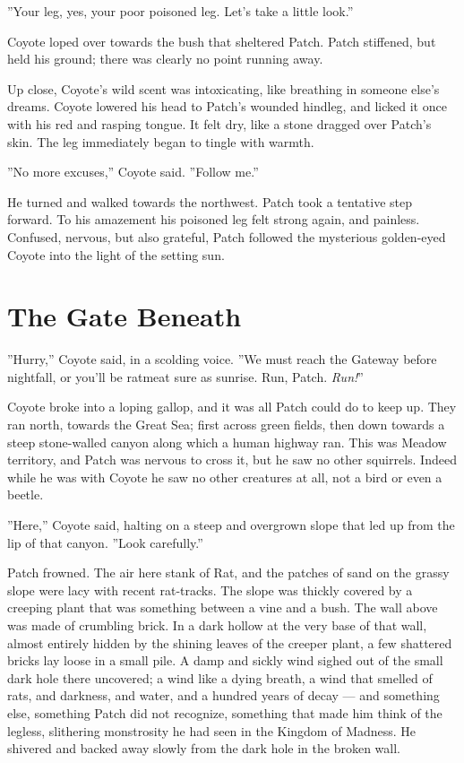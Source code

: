 \documentclass[12pt]{book}
\begin{document}
''Your leg, yes, your poor poisoned leg. Let's take a little look.''

Coyote loped over towards the bush that sheltered Patch. Patch stiffened, but held his ground; there was clearly no point running away.

Up close, Coyote's wild scent was intoxicating, like breathing in someone else's dreams. Coyote lowered his head to Patch's wounded hindleg, and licked it once with his red and rasping tongue. It felt dry, like a stone dragged over Patch's skin. The leg immediately began to tingle with warmth.

''No more excuses,'' Coyote said. ''Follow me.''

He turned and walked towards the northwest. Patch took a tentative step forward. To his amazement his poisoned leg felt strong again, and painless. Confused, nervous, but also grateful, Patch followed the mysterious golden-eyed Coyote into the light of the setting sun.


\section{The Gate Beneath}

''Hurry,'' Coyote said, in a scolding voice. ''We must reach the Gateway before nightfall, or you'll be ratmeat sure as sunrise. Run, Patch. {\it Run!}''

Coyote broke into a loping gallop, and it was all Patch could do to keep up. They ran north, towards the Great Sea; first across green fields, then down towards a steep stone-walled canyon along which a human highway ran. This was Meadow territory, and Patch was nervous to cross it, but he saw no other squirrels. Indeed while he was with Coyote he saw no other creatures at all, not a bird or even a beetle.

''Here,'' Coyote said, halting on a steep and overgrown slope that led up from the lip of that canyon. ''Look carefully.''

Patch frowned. The air here stank of Rat, and the patches of sand on the grassy slope were lacy with recent rat-tracks. The slope was thickly covered by a creeping plant that was something between a vine and a bush. The wall above was made of crumbling brick. In a dark hollow at the very base of that wall, almost entirely hidden by the shining leaves of the creeper plant, a few shattered bricks lay loose in a small pile. A damp and sickly wind sighed out of the small dark hole there uncovered; a wind like a dying breath, a wind that smelled of rats, and darkness, and water, and a hundred years of decay ---
and something else, something Patch did not recognize, something that made him think of the legless, slithering monstrosity he had seen in the Kingdom of Madness. He shivered and backed away slowly from the dark hole in the broken wall.
\end{document}
